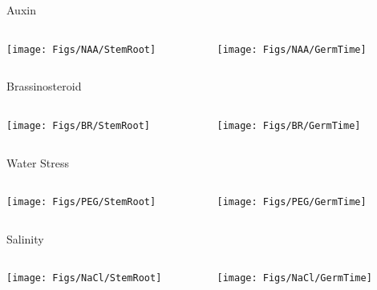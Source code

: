 \documentclass[10pt]{beamer}
\begin{document}
\begin{frame}{Auxin}
  \begin{columns}[T]
    \begin{column}{.5\textwidth}
	\texttt{[image: Figs/NAA/StemRoot]}
    \end{column}
    \begin{column}{.5\textwidth}
	\texttt{[image: Figs/NAA/GermTime]}
    \end{column}
  \end{columns}
\end{frame}


\begin{frame}{Brassinosteroid}
  \begin{columns}[T]
    \begin{column}{.5\textwidth}
	\texttt{[image: Figs/BR/StemRoot]}
    \end{column}
    \begin{column}{.5\textwidth}
	\texttt{[image: Figs/BR/GermTime]}
    \end{column}
  \end{columns}
\end{frame}


\begin{frame}{Water Stress}
  \begin{columns}[T]
    \begin{column}{.5\textwidth}
	\texttt{[image: Figs/PEG/StemRoot]}
    \end{column}
    \begin{column}{.5\textwidth}
	\texttt{[image: Figs/PEG/GermTime]}
    \end{column}
  \end{columns}
\end{frame}


\begin{frame}{Salinity}
  \begin{columns}[T]
    \begin{column}{.5\textwidth}
	\texttt{[image: Figs/NaCl/StemRoot]}
    \end{column}
    \begin{column}{.5\textwidth}
	\texttt{[image: Figs/NaCl/GermTime]}
    \end{column}
  \end{columns}
\end{frame}
\end{document}
